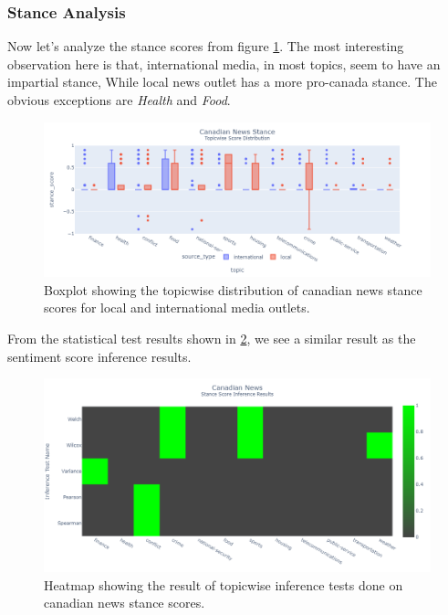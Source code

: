\documentclass{article}
\theoremstyle{mytheoremstyle}
\theoremstyle{mytheoremstyle}
\theoremstyle{myproblemstyle}
\begin{document}
    \subsubsection{Stance Analysis}

    Now let's analyze the stance scores from figure \ref{fig:canada_stance_score_boxplot}. The most interesting observation here is that, international media, in most topics, seem to have an impartial stance, While local news outlet has a more pro-canada stance. The obvious exceptions are \emph{Health} and \emph{Food}.
    
    \begin{figure}[hp]
        \centering
        \includegraphics[width=\linewidth]{../images/plots/Canada/canada_boxplot_stance.png}
        \caption{Boxplot showing the topicwise distribution of canadian news stance scores for local and international media outlets.}
        \label{fig:canada_stance_score_boxplot}
    \end{figure}

    From the statistical test results shown in \ref{fig:canada_stance_score_heatmap}, we see a similar result as the sentiment score inference results. 

    \begin{figure}[hp]
        \centering
        \includegraphics[width=\linewidth]{../images/plots/Canada/canada_heatmap_inference_stance.png}
        \caption{Heatmap showing the result of topicwise inference tests done on canadian news stance scores.}
        \label{fig:canada_stance_score_heatmap}
    \end{figure}
    
\end{document}
